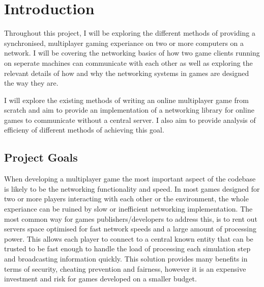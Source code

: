 \chapter{Introduction}
Throughout this project, I will be exploring the different methods of providing a synchronised, multiplayer gaming experiance on two or more computers on a network. I will be covering the networking basics of how two game clients running on seperate machines can communicate with each other as well as exploring the relevant details of how and why the networking systems in games are designed the way they are.


I will explore the existing methods of writing an online multiplayer game from scratch and aim to provide an implementation of a networking library for online games to communicate without a central server. I also aim to provide analysis of efficieny of different methods of achieving this goal.

\section{Project Goals}
When developing a multiplayer game the most important aspect of the codebase is likely to be the networking functionality and speed. In most games designed for two or more players interacting with each other or the environment, the whole experiance can be ruined by slow or inefficient networking implementation. The most common way for games publishers/developers to address this, is to rent out servers space optimised for fast network speeds and a large amount of processing power. This allows each player to connect to a central known entity that can be trusted to be fast enough to handle the load of processing each simulation step and broadcasting information quickly. This solution provides many benefits in terms of security, cheating prevention and fairness, however it is an expensive investment and risk for games developed on a smaller budget.

